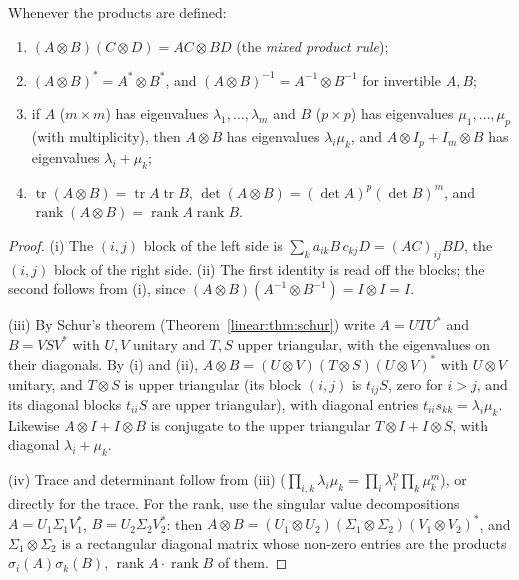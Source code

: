 \begin{proposition}\label{linear:prop:kronecker}
Whenever the products are defined:
\begin{enumerate}[label=(\roman*)]
\item $(A\otimes B)(C\otimes D)=AC\otimes BD$ (the \emph{mixed product rule});
\item $(A\otimes B)^*=A^*\otimes B^*$, and $(A\otimes B)^{-1}=A^{-1}\otimes B^{-1}$ for invertible $A,B$;
\item if $A$ ($m\times m$) has eigenvalues $\lambda_1,\dots,\lambda_m$ and $B$ ($p\times p$) has eigenvalues $\mu_1,\dots,\mu_p$ (with
multiplicity), then $A\otimes B$ has eigenvalues $\lambda_i\mu_k$, and $A\otimes I_p+I_m\otimes B$ has eigenvalues $\lambda_i+\mu_k$;
\item $\operatorname{tr}(A\otimes B)=\operatorname{tr}A\operatorname{tr}B$, $\det(A\otimes B)=(\det A)^p(\det B)^m$, and
$\operatorname{rank}(A\otimes B)=\operatorname{rank}A\operatorname{rank}B$.
\end{enumerate}
\end{proposition}
\begin{proof}
(i) The $(i,j)$ block of the left side is $\sum_ka_{ik}B\,c_{kj}D=(AC)_{ij}BD$, the $(i,j)$ block of the right side. (ii) The
first identity is read off the blocks; the second follows from (i), since $(A\otimes B)(A^{-1}\otimes B^{-1})=I\otimes I=I$.

(iii) By Schur's theorem (Theorem~\ref{linear:thm:schur}) write $A=UTU^*$ and $B=VSV^*$ with $U,V$ unitary and $T,S$ upper triangular, with
the eigenvalues on their diagonals. By (i) and (ii), $A\otimes B=(U\otimes V)(T\otimes S)(U\otimes V)^*$ with $U\otimes V$ unitary,
and $T\otimes S$ is upper triangular (its block $(i,j)$ is $t_{ij}S$, zero for $i>j$, and its diagonal blocks $t_{ii}S$ are upper
triangular), with diagonal entries $t_{ii}s_{kk}=\lambda_i\mu_k$. Likewise $A\otimes I+I\otimes B$ is conjugate to the upper
triangular $T\otimes I+I\otimes S$, with diagonal $\lambda_i+\mu_k$.

(iv) Trace and determinant follow from (iii) ($\prod_{i,k}\lambda_i\mu_k=\prod_i\lambda_i^p\prod_k\mu_k^m$), or directly for the
trace. For the rank, use the singular value decompositions $A=U_1\Sigma_1V_1^*$, $B=U_2\Sigma_2V_2^*$: then $A\otimes B=(U_1\otimes U_2)
(\Sigma_1\otimes\Sigma_2)(V_1\otimes V_2)^*$, and $\Sigma_1\otimes\Sigma_2$ is a rectangular diagonal matrix whose non-zero entries are the
products $\sigma_i(A)\sigma_k(B)$, $\operatorname{rank}A\cdot\operatorname{rank}B$ of them.
\end{proof}


